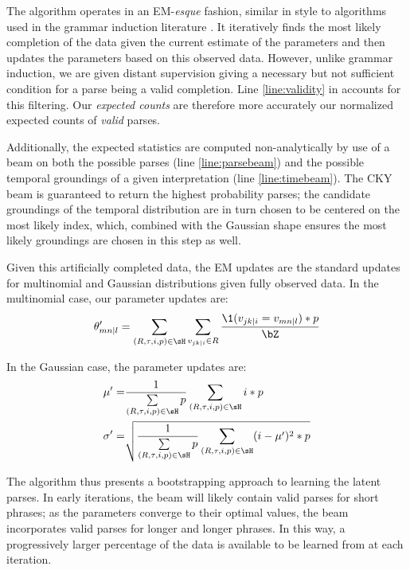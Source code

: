 The algorithm operates in an EM-\textit{esque} fashion, similar in style
	to algorithms used in the grammar induction
	literature \needcite.
It iteratively finds the most
	likely completion of the data given the current estimate of the parameters
	and then updates the parameters based on this observed data.
However, unlike grammar induction, we are given distant supervision giving a 
	necessary but not sufficient condition for a parse being a valid completion.
Line \ref{line:validity} in  accounts for this filtering.
Our \textit{expected counts} are therefore more accurately our normalized
	expected counts of \textit{valid} parses.

Additionally, the expected statistics are computed non-analytically by use of
	a beam on both the possible parses (line \ref{line:parsebeam}) and the
	possible temporal groundings of a given interpretation (line
	\ref{line:timebeam}).
The CKY beam is guaranteed to return the highest probability parses;
	the candidate groundings of the temporal distribution are in turn chosen
	to be centered on the most likely index, which, combined with the Gaussian
	shape ensures the most likely groundings are chosen in this step as well.

Given this artificially completed data, the EM updates are the standard
	updates for multinomial and Gaussian distributions given fully observed data.
In the multinomial case, our parameter updates are:
\begin{equation}
	\theta_{mn \mid l}' =
		\sum\limits_{(R,\tau,i,p) \in \sH} \sum\limits_{v_{jk \mid i} \in R}
		\frac{
			\1(v_{jk \mid i} = v_{mn \mid l}) * p
		}{
			\bZ
		}
\label{eqn:multinomialEM}
\end{equation}

In the Gaussian case, the parameter updates are:
\begin{align}
	\mu' =&
		\frac{ 1 } { \sum\limits_{(R,\tau,i,p) \in \sH}  p }
		\sum\limits_{(R,\tau,i,p) \in \sH} i * p \\
	\sigma' =& \sqrt{
		\frac{ 1 } { \sum\limits_{(R,\tau,i,p) \in \sH}  p }
		\sum\limits_{(R,\tau,i,p) \in \sH} (i-\mu')^2 * p
	}
\label{eqn:multinomialEM}
\end{align}

The algorithm thus presents a bootstrapping approach to learning the latent
	parses.
In early iterations, the beam will likely contain valid parses for short
	phrases;
	as the parameters converge to their optimal values, the beam incorporates
	valid parses for longer and longer phrases.
In this way, a progressively larger percentage of the data is available to be
	learned from at each iteration.

